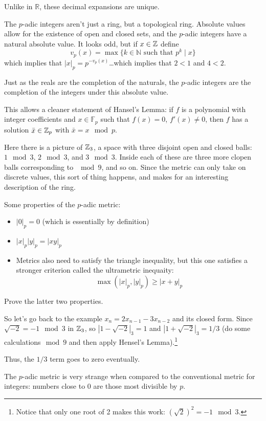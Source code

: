 Unlike in $\mathbb{R}$, these decimal expansions are unique.

The $p$-adic integers aren't just a ring, but a topological ring. Absolute values allow for the existence of open and closed sets, and the $p$-adic integers have a natural absolute value. It looks odd, but if $x\in\mathbb{Z}$ define
\[v_p(x) = \max\{k\in\mathbb{N}\text{ such that } p^k\mid x\}\]
which implies that $|x|_p = p^{-v_p(x)}$\dots which implies that $2<1$ and $4<2$.

Just as the reals are the completion of the naturals, the $p$-adic integers are the completion of the integers under this absolute value.

This allows a cleaner statement of Hansel's Lemma: if $f$ is a polynomial with integer coefficients and $x\in\mathbb{F}_p$ such that $f(x)=0$, $f'(x)\ne 0$, then $f$ has a solution $\bar x\in\mathbb{Z}_p$ with $\bar x = x\mod p$.

Here there is a picture of $\mathbb{Z}_3$, a space with three disjoint open and closed balls: $1\mod 3$, $2\mod 3$, and $3 \mod 3$. Inside each of these are three more clopen balls corresponding to $\mod 9$, and so on. Since the metric can only take on discrete values, this sort of thing happens, and makes for an interesting description of the ring.

Some properties of the $p$-adic metric:
\begin{itemize}
\item $|0|_p = 0$ (which is essentially by definition)
\item $|x|_p|y|_p = |xy|_p$
\item Metrics also need to satisfy the triangle inequality, but this one satisfies a stronger criterion called the ultrametric inequaity: \[\max(|x|_p,|y|_p)\ge |x+y|_p\]
\end{itemize}
\begin{ex}
Prove the latter two properties.
\end{ex}

So let's go back to the example $x_n = 2x_{n-1}-3x_{n-2}$ and its closed form. Since $\sqrt{-2} = -1\mod 3$ in $\mathbb{Z}_3$, so $|1-\sqrt{-2}|_3 = 1$ and $|1+\sqrt{-2}|_3 = 1/3$ (do some calculations$\mod 9$ and then apply Hensel's Lemma).\footnote{Notice that only one root of 2 makes this work: $(\sqrt{2})^2 = -1\mod 3$.}

Thus, the $1/3$ term goes to zero eventually.

The $p$-adic metric is very strange when compared to the conventional metric for integers: numbers close to 0 are those most divisible by $p$.


